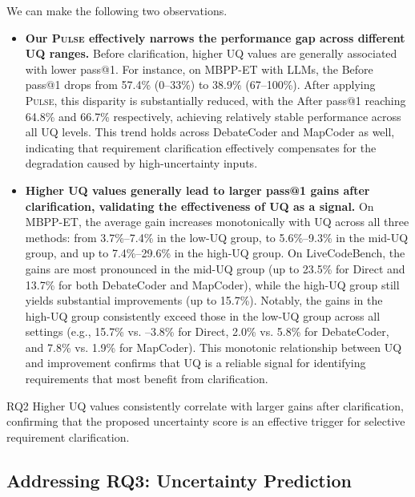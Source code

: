 We can make the following two observations.
\begin{itemize}[leftmargin=1em]
    \item \textbf{Our \textsc{Pulse} effectively narrows the performance gap across different UQ ranges.} Before clarification, higher UQ values are generally associated with lower pass@1. For instance, on MBPP-ET with LLMs, the Before pass@1 drops from 57.4\% (0–33\%) to 38.9\% (67–100\%). After applying \textsc{Pulse}, this disparity is substantially reduced, with the After pass@1 reaching 64.8\% and 66.7\% respectively, achieving relatively stable performance across all UQ levels. This trend holds across DebateCoder and MapCoder as well, indicating that requirement clarification effectively compensates for the degradation caused by high-uncertainty inputs.

    \item \textbf{Higher UQ values generally lead to larger pass@1 gains after clarification, validating the effectiveness of UQ as a signal.} On MBPP-ET, the average gain increases monotonically with UQ across all three methods: from 3.7\%–7.4\% in the low-UQ group, to 5.6\%–9.3\% in the mid-UQ group, and up to 7.4\%–29.6\% in the high-UQ group. On LiveCodeBench, the gains are most pronounced in the mid-UQ group (up to 23.5\% for Direct and 13.7\% for both DebateCoder and MapCoder), while the high-UQ group still yields substantial improvements (up to 15.7\%). Notably, the gains in the high-UQ group consistently exceed those in the low-UQ group across all settings (e.g., 15.7\% vs. –3.8\% for Direct, 2.0\% vs. 5.8\% for DebateCoder, and 7.8\% vs. 1.9\% for MapCoder). This monotonic relationship between UQ and improvement confirms that UQ is a reliable signal for identifying requirements that most benefit from clarification.
\end{itemize}


\begin{rqsummary}{RQ2}
    Higher UQ values consistently correlate with larger gains after clarification, confirming that the proposed uncertainty score is an effective trigger for selective requirement clarification.
\end{rqsummary}





\subsection{Addressing RQ3: Uncertainty Prediction}
\label{sec:rq3}

